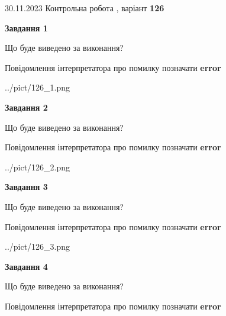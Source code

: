 \documentclass[12pt, ukrainian]{article}
\begin{document}
{{30.11.2023 Контрольна робота , варіант  \No \textbf { 126 }\par}}
{




{\begin {center}\textbf{Завдання 1}\end {center}}\par
Що буде виведено за виконання? \par
Повідомлення інтерпретатора про помилку позначати \textbf{error}

\begin{center}
	{../pict/126_1.png}
\end{center}
\newpage

{\begin {center}\textbf{Завдання 2}\end {center}}\par
Що буде виведено за виконання? \par
Повідомлення інтерпретатора про помилку позначати \textbf{error}

\begin{center}
	{../pict/126_2.png}
\end{center}
\newpage

{\begin {center}\textbf{Завдання 3}\end {center}}\par
Що буде виведено за виконання? \par
Повідомлення інтерпретатора про помилку позначати \textbf{error}

\begin{center}
	{../pict/126_3.png}
\end{center}
\newpage

{\begin {center}\textbf{Завдання 4}\end {center}}\par
Що буде виведено за виконання? \par
Повідомлення інтерпретатора про помилку позначати \textbf{error}

}
\end{document}
